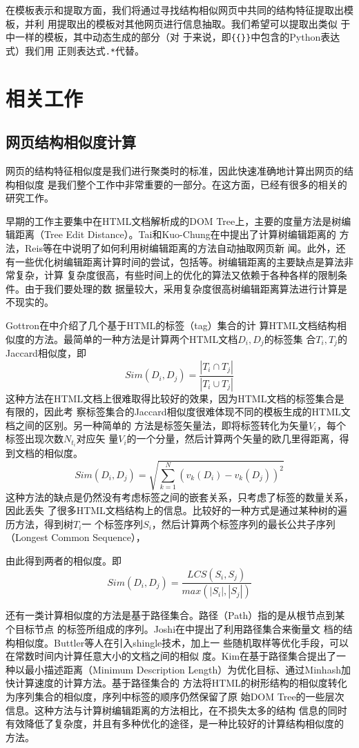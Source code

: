 在模板表示和提取方面，我们将通过寻找结构相似网页中共同的结构特征提取出模板，并利
用提取出的模板对其他网页进行信息抽取。我们希望可以提取出类似
于中一样的模板，其中动态生成的部分（对
于来说，即\texttt{\{\{\}\}}中包含的Python表达式）我们用
正则表达式\texttt{.*}代替。
\section{相关工作}
\label{sec:relatedwork}

\subsection{网页结构相似度计算}
\label{sec:relatedwork:sim}
网页的结构特征相似度是我们进行聚类时的标准，因此快速准确地计算出网页的结构相似度
是我们整个工作中非常重要的一部分。在这方面，已经有很多的相关的研究工作。

早期的工作主要集中在HTML文档解析成的DOM Tree上，主要的度量方法是树编辑距离（Tree
Edit Distance）。Tai和Kuo-Chung在中提出了计算树编辑距离的
方法，Reis等在中说明了如何利用树编辑距离的方法自动抽取网页新
闻。此外，还有一些优化树编辑距离计算时间的尝试，包括等。树编辑距离的主要缺点是算法非常复杂，计算
复杂度很高，有些时间上的优化的算法又依赖于各种各样的限制条件。由于我们要处理的数
据量较大，采用复杂度很高树编辑距离算法进行计算是不现实的。

Gottron在中介绍了几个基于HTML的标签（tag）集合的计
算HTML文档结构相似度的方法。最简单的一种方法是计算两个HTML文档$D_i,D_{j}$的标签集
合$T_i, T_j$的Jaccard相似度，即
\[
Sim(D_i,D_j)=\frac{|T_i \cap T_j|}{|T_i \cup T_j|}
\]
这种方法在HTML文档上很难取得比较好的效果，因为HTML文档的标签集合是有限的，因此考
察标签集合的Jaccard相似度很难体现不同的模板生成的HTML文档之间的区别。另一种简单的
方法是标签矢量法，即将标签转化为矢量$V_i$，每个标签出现次数$N_{t_i}$对应矢
量$V_i$的一个分量，然后计算两个矢量的欧几里得距离，得到文档的相似度。
\[
Sim(D_i,D_j)=\sqrt{\sum_{k=1}^N(v_k(D_i)-v_k(D_j))^2}
\]
这种方法的缺点是仍然没有考虑标签之间的嵌套关系，只考虑了标签的数量关系，因此丢失
了很多HTML文档结构上的信息。比较好的一种方式是通过某种树的遍历方法，得到树$T_i$一
个标签序列$S_i$，然后计算两个标签序列的最长公共子序列（Longest Common Sequence），

由此得到两者的相似度。即
\[
Sim(D_i,D_j)=\frac{LCS(S_i,S_j)}{max(|S_i|,|S_j|)}
\]

还有一类计算相似度的方法是基于路径集合。路径（Path）指的是从根节点到某个目标节点
的标签所组成的序列。Joshi在中提出了利用路径集合来衡量文
档的结构相似度。Buttler等人在引入shingle技术，加上一
些随机取样等优化手段，可以在常数时间内计算任意大小的文档之间的相似
度。Kim在基于路径集合提出了一种以最小描述距离（Minimum
Description Length）为优化目标、通过Minhash加快计算速度的计算方法。基于路径集合的
方法将HTML的树形结构的相似度转化为序列集合的相似度，序列中标签的顺序仍然保留了原
始DOM Tree的一些层次信息。这种方法与计算树编辑距离的方法相比，在不损失太多的结构
信息的同时有效降低了复杂度，并且有多种优化的途径，是一种比较好的计算结构相似度的
方法。


